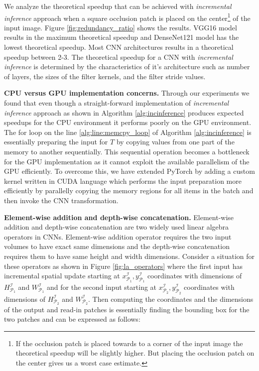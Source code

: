 We analyze the theoretical speedup that can be achieved with \textit{incremental inference} approach when a square occlusion patch is placed on the center\footnote{If the occlusion patch is placed towards to a corner of the input image the theoretical speedup will be slightly higher. But placing the occlusion patch on the center gives us a worst case estimate.} of the input image. Figure \ref{fig:redundancy_ratio} shows the results. VGG16 model results in the maximum theoretical speedup and DenseNet121 model has the lowest theoretical speedup. Most CNN architectures results in a theoretical speedup between 2-3. The theoretical speedup for a CNN with \textit{incremental inference} is determined by the characteristics of it's architecture such as number of layers, the sizes of the filter kernels, and the filter stride values.


\vspace{2mm}
\noindent \textbf{CPU versus GPU implementation concerns.}
Through our experiments we found that even though a straight-forward implementation of \textit{incremental inference} approach as shown in Algorithm \ref{alg:incinference} produces expected speedups for the CPU environment it performs poorly on the GPU environment.
The for loop on the line \ref{alg:line:memcpy_loop} of Algorithm \ref{alg:incinference} is essentially preparing the input for $T$ by copying values from one part of the memory to another sequentially.
This sequential operation becomes a bottleneck for the GPU implementation as it cannot exploit the available parallelism of the GPU efficiently.
To overcome this, we have extended PyTorch by adding a custom kernel written in CUDA language which performs the input preparation more efficiently by parallelly copying the memory regions for all items in the batch and then invoke the CNN transformation.

\vspace{2mm}
\noindent \textbf{Element-wise addition and depth-wise concatenation.}
Element-wise addition and depth-wise concatenation are two widely used linear algebra operators in CNNs.
Element-wise addition operator requires the two input volumes to have exact same dimensions and the depth-wise concatenation requires them to have same height and width dimensions.
Consider a situation for these operators as shown in Figure \ref{fig:la_operators} where the first input has incremental spatial update starting at $x^\mathcal{I}_{\mathcal{P}_1},y^\mathcal{I}_{\mathcal{P}_1}$ coordinates with dimensions of $H^\mathcal{I}_{\mathcal{P}_1}$ and $W^\mathcal{I}_{\mathcal{P}_1}$ and for the second input starting at $x^\mathcal{I}_{\mathcal{P}_2},y^\mathcal{I}_{\mathcal{P}_2}$ coordinates with dimensions of $H^\mathcal{I}_{\mathcal{P}_2}$ and $W^\mathcal{I}_{\mathcal{P}_2}$.
Then computing the coordinates and the dimensions of the output and read-in patches is essentially finding the bounding box for the two patches and can be expressed as follows:


